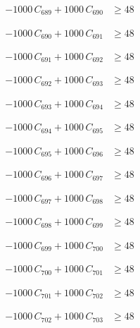 \documentclass[a4paper,11pt]{article}
\begin{document}
\begin{align}
-1000\,C_{689} + 1000\,C_{690} &\geq 48 \nonumber
\end{align}

\begin{align}
-1000\,C_{690} + 1000\,C_{691} &\geq 48 \nonumber
\end{align}

\begin{align}
-1000\,C_{691} + 1000\,C_{692} &\geq 48 \nonumber
\end{align}

\begin{align}
-1000\,C_{692} + 1000\,C_{693} &\geq 48 \nonumber
\end{align}

\begin{align}
-1000\,C_{693} + 1000\,C_{694} &\geq 48 \nonumber
\end{align}

\begin{align}
-1000\,C_{694} + 1000\,C_{695} &\geq 48 \nonumber
\end{align}

\begin{align}
-1000\,C_{695} + 1000\,C_{696} &\geq 48 \nonumber
\end{align}

\begin{align}
-1000\,C_{696} + 1000\,C_{697} &\geq 48 \nonumber
\end{align}

\begin{align}
-1000\,C_{697} + 1000\,C_{698} &\geq 48 \nonumber
\end{align}

\begin{align}
-1000\,C_{698} + 1000\,C_{699} &\geq 48 \nonumber
\end{align}

\begin{align}
-1000\,C_{699} + 1000\,C_{700} &\geq 48 \nonumber
\end{align}

\begin{align}
-1000\,C_{700} + 1000\,C_{701} &\geq 48 \nonumber
\end{align}

\begin{align}
-1000\,C_{701} + 1000\,C_{702} &\geq 48 \nonumber
\end{align}

\begin{align}
-1000\,C_{702} + 1000\,C_{703} &\geq 48 \nonumber
\end{align}
\end{document}
